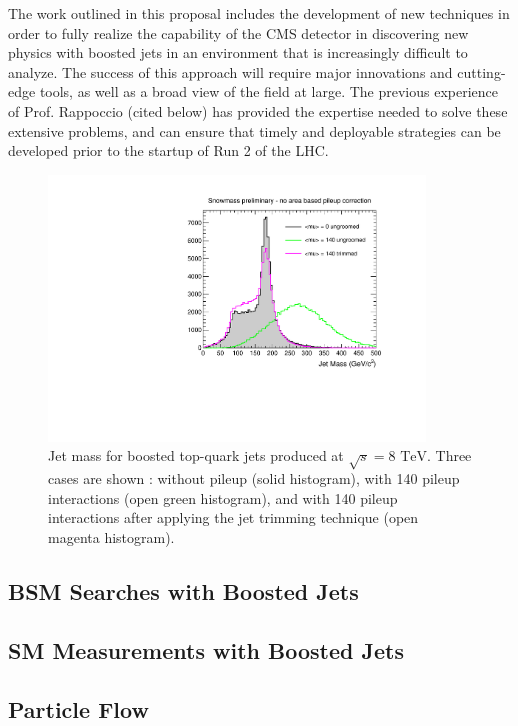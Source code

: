 \documentclass[12pt]{proposalnsf}
\newcommand{\TeV}{\ensuremath{\mathrm{TeV}}}
\begin{document}
The work outlined in this proposal includes the development of new
techniques in order to fully realize the
capability of the CMS detector in discovering new physics with boosted
jets in an environment that is increasingly difficult to analyze. The
success of this approach
will require major innovations and cutting-edge tools, as
well as a broad view of the field at large. The
previous experience of Prof. Rappoccio (cited below) has provided the expertise
needed to solve these extensive problems, and can ensure that timely
and deployable strategies can be developed prior to the startup of Run
2 of the LHC. 

\begin{figure}[h!]
    \centering
    \includegraphics[width=100mm]{jetmass_toptags_trimming}
    \caption{\label{jetmass_toptags_trimming} Jet mass for boosted
      top-quark jets produced at $\sqrt{s} = 8$ \TeV. Three cases are
      shown : without pileup (solid histogram), with 140 pileup
      interactions (open green histogram), and with 140 pileup
      interactions after applying the jet trimming technique (open
      magenta histogram).}
\end{figure}


\subsection{BSM Searches with Boosted Jets}
\label{sec:bsm}

\subsection{SM Measurements with Boosted Jets}
\label{sec:topxs}


\subsection{Particle Flow}
\label{sec:pf}
\end{document}
